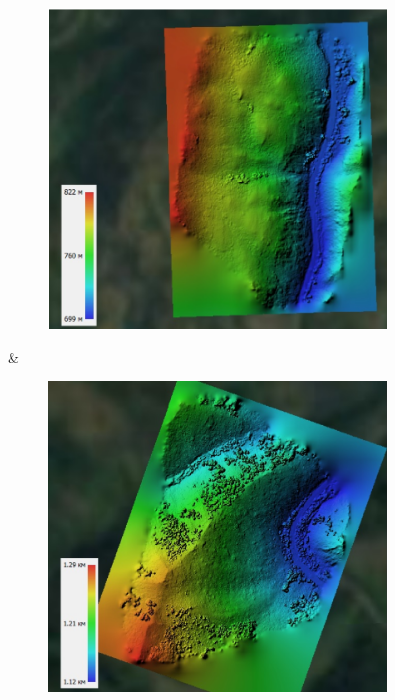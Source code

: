 \begin{figure}[H]
	\centering
	\includegraphics[width=0.8\textwidth]{media/ict2/image205}
	\caption*{}
\end{figure}
 &
\begin{figure}[H]
	\centering
	\includegraphics[width=0.8\textwidth]{media/ict2/image206}
	\caption*{}
\end{figure}
 \\
